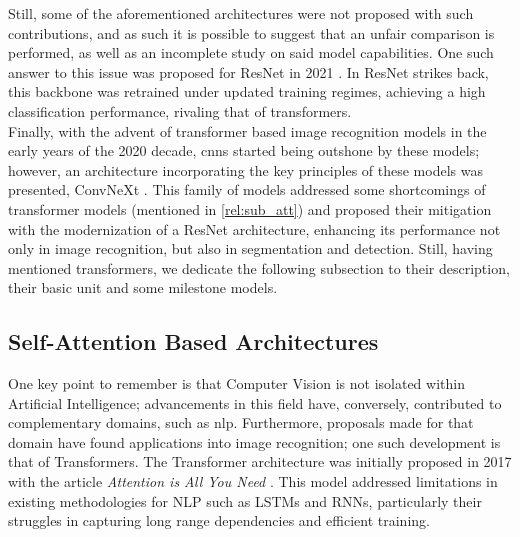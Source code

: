 \noindent Still, some of the aforementioned architectures were not proposed with such 
contributions, and as such it is possible to suggest that an unfair comparison is performed, 
as well as an incomplete study on said model capabilities. One such answer to this issue was 
proposed for ResNet in 2021 \autocite{wightman2021resnet}. In ResNet strikes back, this backbone 
was retrained under updated training regimes, achieving a high classification performance, rivaling 
that of transformers.\\
\noindent Finally, with the advent of transformer based image recognition models in the early years of the 
2020 decade, \glspl{cnn} started being outshone by these models; however, an architecture 
incorporating the key principles of these models was presented, ConvNeXt \autocite{liu2022convnet}.
This family of models addressed some shortcomings of transformer models (mentioned in 
\autoref{rel:sub_att}) and proposed their mitigation with the modernization of a ResNet 
architecture, enhancing its performance not only in image recognition, but also in segmentation and 
detection. Still, having mentioned transformers, we dedicate the following subsection to their 
description, their basic unit and some milestone models.
\subsection{Self-Attention Based Architectures}
\label{rel:sub_att}
One key point to remember is that Computer Vision is not isolated within Artificial 
Intelligence; advancements in this field have, conversely, contributed to complementary domains, 
such as \gls{nlp}. Furthermore, proposals made for that domain have found applications into image 
recognition; one such development is that of Transformers. The Transformer architecture was 
initially proposed in 2017 with the article \emph{Attention is All You Need} 
\autocite{vaswani2017attention}. This model addressed limitations in existing methodologies for 
NLP such as LSTMs and RNNs, particularly their struggles in capturing long range dependencies 
and efficient training.\\

